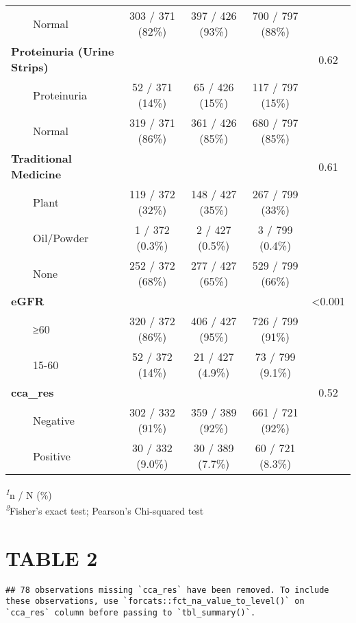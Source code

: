 \documentclass[
]{article}
\begin{document}
\begin{longtable}{lcccc}
    Normal & 303 / 371 (82\%) & 397 / 426 (93\%) & 700 / 797 (88\%) &  \\ 
\textbf{Proteinuria (Urine Strips)} &  &  &  & 0.62 \\ 
    Proteinuria & 52 / 371 (14\%) & 65 / 426 (15\%) & 117 / 797 (15\%) &  \\ 
    Normal & 319 / 371 (86\%) & 361 / 426 (85\%) & 680 / 797 (85\%) &  \\ 
\textbf{Traditional Medicine} &  &  &  & 0.61 \\ 
    Plant & 119 / 372 (32\%) & 148 / 427 (35\%) & 267 / 799 (33\%) &  \\ 
    Oil/Powder & 1 / 372 (0.3\%) & 2 / 427 (0.5\%) & 3 / 799 (0.4\%) &  \\ 
    None & 252 / 372 (68\%) & 277 / 427 (65\%) & 529 / 799 (66\%) &  \\ 
\textbf{eGFR} &  &  &  & <0.001 \\ 
    ≥60 & 320 / 372 (86\%) & 406 / 427 (95\%) & 726 / 799 (91\%) &  \\ 
    15-60 & 52 / 372 (14\%) & 21 / 427 (4.9\%) & 73 / 799 (9.1\%) &  \\ 
\textbf{cca\_res} &  &  &  & 0.52 \\ 
    Negative & 302 / 332 (91\%) & 359 / 389 (92\%) & 661 / 721 (92\%) &  \\ 
    Positive & 30 / 332 (9.0\%) & 30 / 389 (7.7\%) & 60 / 721 (8.3\%) &  \\ 
\bottomrule
\end{longtable}
\begin{minipage}{\linewidth}
\textsuperscript{\textit{1}}n / N (\%)\\
\textsuperscript{\textit{2}}Fisher's exact test; Pearson's Chi-squared test\\
\end{minipage}

\section{TABLE 2}\label{table-2}

\begin{verbatim}
## 78 observations missing `cca_res` have been removed. To include these observations, use `forcats::fct_na_value_to_level()` on `cca_res` column before passing to `tbl_summary()`.
\end{verbatim}
\end{document}
